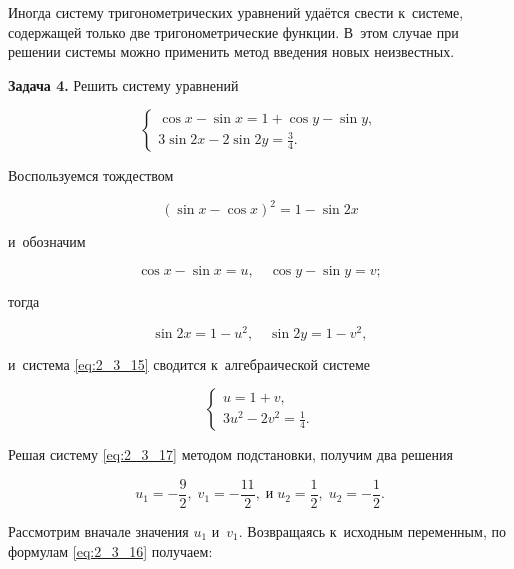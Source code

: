 Иногда систему тригонометрических уравнений удаётся свести к~системе,
содержащей только две тригонометрические функции. В~этом случае при
решении системы можно применить метод введения новых неизвестных.

\textbf{Задача 4.}\label{ex:2_3_4} Решить систему уравнений

\begin{equation}\label{eq:2_3_15}
\begin{cases}
\cos x - \sin x = 1 + \cos y - \sin y, \\
\displaystyle 3\sin 2x - 2\sin 2y = \frac{3}{4}.
\end{cases}
\end{equation}

Воспользуемся тождеством

\begin{equation*}
(\sin x - \cos x)^{2} = 1 - \sin 2x
\end{equation*}

\noindent
и~обозначим

\begin{equation}\label{eq:2_3_16}
\cos x - \sin x = u, \quad \cos y - \sin y = v;
\end{equation}

\noindent
тогда

\begin{equation*}
\sin 2x = 1 - u^{2}, \quad \sin 2y = 1 - v^{2},
\end{equation*}

\noindent
и~система \eqref{eq:2_3_15} сводится к~алгебраической системе

\begin{equation}\label{eq:2_3_17}
\begin{cases}
u = 1 + v, \\
\displaystyle 3u^{2} - 2v^{2} = \frac{1}{4}.
\end{cases}
\end{equation}

Решая систему \eqref{eq:2_3_17} методом подстановки, получим два решения

\begin{equation*}
\displaystyle u_{1} = -\frac{9}{2}, \;
\displaystyle v_{1} = -\frac{11}{2}, \; \text{и} \;
\displaystyle u_{2} = \frac{1}{2}, \;
\displaystyle u_{2} = -\frac{1}{2}.
\end{equation*}

Рассмотрим вначале значения $u_{1}$ и~$v_{1}$. 
Возвращаясь к~исходным переменным, по формулам \eqref{eq:2_3_16} получаем:

